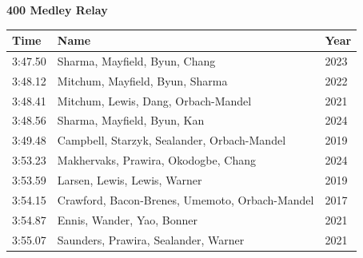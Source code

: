 \vspace{1.2em}
\noindent\begin{minipage}[t]{0.98\textwidth}
\centering
\textbf{\textcolor{teamprimary}{400 Medley Relay}}\par
\vspace{0.5em}
\centering
\small
\renewcommand{\arraystretch}{1.0}
\setlength{\tabcolsep}{4pt}
\begin{tabular}{@{}p{4.5cm}p{8.5cm}p{2.5cm}@{}}
\toprule
\textbf{Time} & \textbf{Name} & \textbf{Year} \\
\midrule
3:47.50 & Sharma, Mayfield, Byun, Chang & 2023 \\
3:48.12 & Mitchum, Mayfield, Byun, Sharma & 2022 \\
3:48.41 & Mitchum, Lewis, Dang, Orbach-Mandel & 2021 \\
3:48.56 & Sharma, Mayfield, Byun, Kan & 2024 \\
3:49.48 & Campbell, Starzyk, Sealander, Orbach-Mandel & 2019 \\
3:53.23 & Makhervaks, Prawira, Okodogbe, Chang & 2024 \\
3:53.59 & Larsen, Lewis, Lewis, Warner & 2019 \\
3:54.15 & Crawford, Bacon-Brenes, Umemoto, Orbach-Mandel & 2017 \\
3:54.87 & Ennis, Wander, Yao, Bonner & 2021 \\
3:55.07 & Saunders, Prawira, Sealander, Warner & 2021 \\
\bottomrule
\end{tabular}
\end{minipage}
\clearpage
